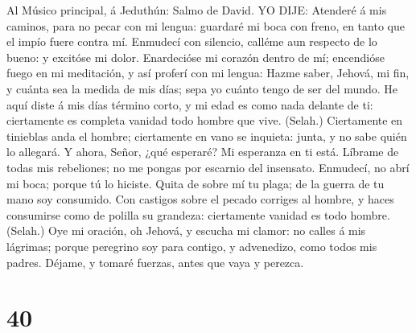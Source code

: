  Al Músico principal, á Jeduthún: Salmo de David. YO DIJE:
Atenderé á mis caminos, para no pecar con mi lengua: guardaré mi boca
con freno, en tanto que el impío fuere contra mí.  Enmudecí
con silencio, calléme aun respecto de lo bueno: y excitóse mi dolor.
 Enardecióse mi corazón dentro de mí; encendióse fuego en mi
meditación, y así proferí con mi lengua:  Hazme saber,
Jehová, mi fin, y cuánta sea la medida de mis días; sepa yo cuánto tengo
de ser del mundo.  He aquí diste á mis días término corto, y
mi edad es como nada delante de ti: ciertamente es completa vanidad todo
hombre que vive. (Selah.)  Ciertamente en tinieblas anda el
hombre; ciertamente en vano se inquieta: junta, y no sabe quién lo
allegará.  Y ahora, Señor, ¿qué esperaré? Mi esperanza en ti
está.  Líbrame de todas mis rebeliones; no me pongas por
escarnio del insensato.  Enmudecí, no abrí mi boca; porque
tú lo hiciste.  Quita de sobre mí tu plaga; de la guerra de
tu mano soy consumido.  Con castigos sobre el pecado
corriges al hombre, y haces consumirse como de polilla su grandeza:
ciertamente vanidad es todo hombre. (Selah.)  Oye mi
oración, oh Jehová, y escucha mi clamor: no calles á mis lágrimas;
porque peregrino soy para contigo, y advenedizo, como todos mis padres.
 Déjame, y tomaré fuerzas, antes que vaya y perezca.

\hypertarget{section-39}{%
\section{40}\label{section-39}}

